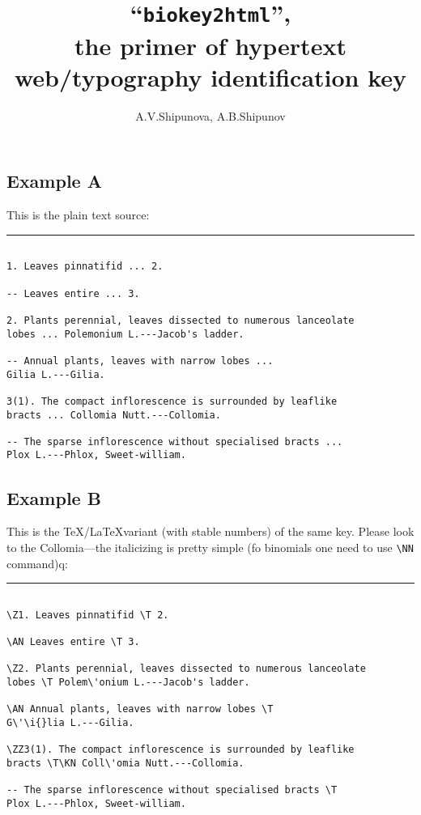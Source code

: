 \documentclass[a4paper,12pt]{article}
\author{\IN A.V.Shipunova, \IN A.B.Shipunov}
\title{``\texttt{biokey2html}'',\\ the primer of hypertext web/typography identification key}
\date{}
\begin{document}
\maketitle

\subsection*{Example A}

This is the plain text source:

\bigskip\hrule
\begin{verbatim}

1. Leaves pinnatifid ... 2.

-- Leaves entire ... 3.

2. Plants perennial, leaves dissected to numerous lanceolate 
lobes ... Polemonium L.---Jacob's ladder.

-- Annual plants, leaves with narrow lobes ... 
Gilia L.---Gilia.

3(1). The compact inflorescence is surrounded by leaflike 
bracts ... Collomia Nutt.---Collomia.

-- The sparse inflorescence without specialised bracts ...
Plox L.---Phlox, Sweet-william.

\end{verbatim}

\subsection*{Example B}

This is the \TeX/\LaTeX variant (with stable numbers) of the same key. Please look to the Collomia---the italicizing is pretty simple (fo binomials one need to use \verb|\NN| command)q:

\bigskip\hrule
\begin{verbatim}

\Z1. Leaves pinnatifid \T 2.

\AN Leaves entire \T 3.

\Z2. Plants perennial, leaves dissected to numerous lanceolate 
lobes \T Polem\'onium L.---Jacob's ladder.

\AN Annual plants, leaves with narrow lobes \T 
G\'\i{}lia L.---Gilia.

\ZZ3(1). The compact inflorescence is surrounded by leaflike 
bracts \T\KN Coll\'omia Nutt.---Collomia.

-- The sparse inflorescence without specialised bracts \T
Plox L.---Phlox, Sweet-william.

\end{verbatim}
\end{document}
